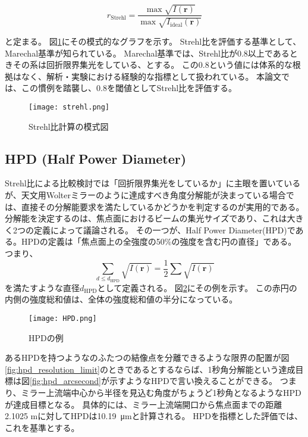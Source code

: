 \[
r_{\mathrm{Strehl}} = \frac{ \max{\sqrt{I(\mathbf{r})} } }{ \max{ \sqrt{I_{\mathrm{ideal}}( \mathbf{r} )} } }
\]

と定まる。
図\ref{fig:strehl_explanation}にその模式的なグラフを示す。
Strehl比を評価する基準として、Marechal基準\cite{BornWolf:1999:Book}が知られている。
Marechal基準では、Strehl比が0.8以上であるときその系は回折限界集光をしている、とする。
この0.8という値には体系的な根拠はなく、解析・実験における経験的な指標として扱われている。
本論文では、この慣例を踏襲し、0.8を閾値としてStrehl比を評価する。

\begin{figure}[h]
\centering
\texttt{[image: strehl.png]}
\caption{Strehl比計算の模式図}
\label{fig:strehl_explanation}
\end{figure}

\subsection{HPD (Half Power Diameter)}
\label{chap2_hpd}

Strehl比による比較検討では「回折限界集光をしているか」に主眼を置いているが、天文用Wolterミラーのように達成すべき角度分解能が決まっている場合では、直接その分解能要求を満たしているかどうかを判定するのが実用的である。
分解能を決定するのは、焦点面におけるビームの集光サイズであり、これは大きく2つの定義によって議論される。
その一つが、Half Power Diameter(HPD)である。HPDの定義は「焦点面上の全強度の50\%の強度を含む円の直径」である。つまり、
\[
    \sum_{d\leq d_{\mathrm{HPD}}} \sqrt{ I(\mathbf{r}) } = \frac{1}{2} \sum \sqrt{ I(\mathbf{r}) }
\]
を満たすような直径$d_{\mathrm{HPD}}$として定義される。
図\ref{fig:hpd_explanation}にその例を示す。
この赤円の内側の強度総和値は、全体の強度総和値の半分になっている。

\begin{figure}[!ht]
\centering
\texttt{[image: HPD.png]}
\caption{HPDの例}
\label{fig:hpd_explanation}
\end{figure}

あるHPDを持つようなのふたつの結像点を分離できるような限界の配置が図\ref{fig:hpd_resolution_limit}のときであるとするならば、1秒角分解能という達成目標は図\ref{fig:hpd_arcsecond}が示すようなHPDで言い換えることができる。
つまり、ミラー上流端中心から半径を見込む角度がちょうど1秒角となるようなHPDが達成目標となる。
具体的には、ミラー上流端開口から焦点面までの距離2.1025 mに対してHPDは\SI{10.19}{\micro \metre}と計算される。
HPDを指標とした評価では、これを基準とする。

